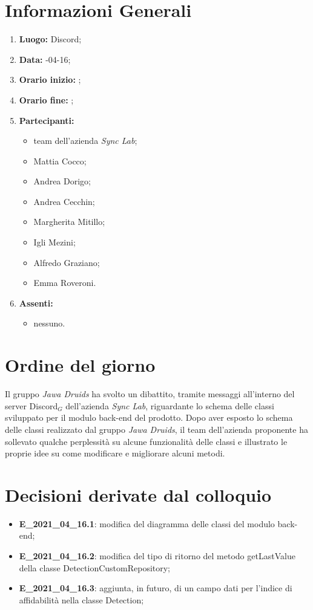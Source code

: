 \newpage
\section{Informazioni Generali}
\begin{enumerate}
	\item \textbf{Luogo:} \normalfont Discord;
	\item \textbf{Data:} -04-16;
	\item \textbf{Orario inizio:} ;
	\item \textbf{Orario fine:} ;
	\item \textbf{Partecipanti:}
	\begin{itemize}
		\item team dell'azienda \textit{Sync Lab};
		\item Mattia Cocco;
		\item Andrea Dorigo;
		\item Andrea Cecchin;
		\item Margherita Mitillo;
		\item Igli Mezini;
		\item Alfredo Graziano;
		\item Emma Roveroni.
	\end{itemize}
	\item \textbf{Assenti:}
	\begin{itemize}
		\item nessuno.
	\end{itemize}
\end{enumerate}
\section{Ordine del giorno}
Il gruppo \textit{Jawa Druids} ha svolto un dibattito, tramite messaggi all'interno del server Discord$_G$ dell'azienda \textit{Sync Lab}, riguardante lo schema delle classi sviluppato per il modulo back-end del prodotto. 
Dopo aver esposto lo schema delle classi realizzato dal gruppo \textit{Jawa Druids}, il team dell'azienda proponente ha sollevato qualche perplessità su alcune funzionalità delle classi e illustrato le proprie idee su come modificare e migliorare alcuni metodi.
\section{Decisioni derivate dal colloquio}
\begin{itemize}
	\item \textbf{E\_2021\_04\_16.1}: modifica del diagramma delle classi del modulo back-end;
	\item \textbf{E\_2021\_04\_16.2}: modifica del tipo di ritorno del metodo getLastValue della classe DetectionCustomRepository;
	\item \textbf{E\_2021\_04\_16.3}: aggiunta, in futuro, di un campo dati per l'indice di affidabilità nella classe Detection;
\end{itemize}